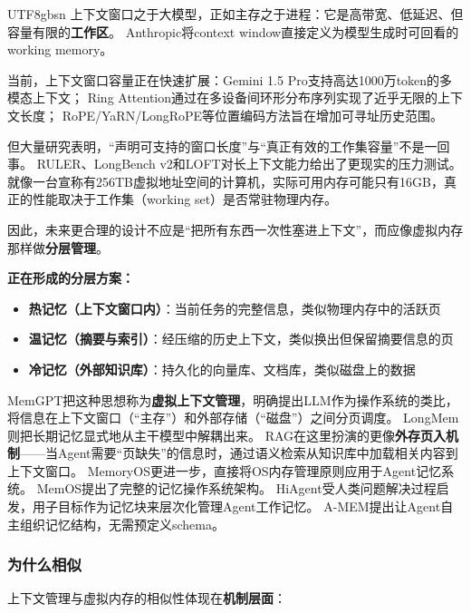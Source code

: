 \documentclass[11pt,a4paper]{article}
\begin{document}
\begin{CJK*}{UTF8}{gbsn}
上下文窗口之于大模型，正如主存之于进程：它是高带宽、低延迟、但容量有限的\textbf{工作区}。
Anthropic将context window直接定义为模型生成时可回看的working memory。

当前，上下文窗口容量正在快速扩展：Gemini 1.5 Pro支持高达1000万token的多模态上下文\cite{gemini2024}；
Ring Attention通过在多设备间环形分布序列实现了近乎无限的上下文长度\cite{liu2024ringattention}；
RoPE/YaRN/LongRoPE等位置编码方法旨在增加可寻址历史范围\cite{su2021roformer,yarn2024,longrope2024}。

但大量研究表明，``声明可支持的窗口长度''与``真正有效的工作集容量''不是一回事。
RULER、LongBench v2和LOFT对长上下文能力给出了更现实的压力测试\cite{ruler2024,longbenchv2_2024,loft2024}。
就像一台宣称有256TB虚拟地址空间的计算机，实际可用内存可能只有16GB，真正的性能取决于工作集（working set）是否常驻物理内存。

因此，未来更合理的设计不应是``把所有东西一次性塞进上下文''，而应像虚拟内存那样做\textbf{分层管理}。

\textbf{正在形成的分层方案：}
\begin{itemize}[nosep]
\item \textbf{热记忆（上下文窗口内）}：当前任务的完整信息，类似物理内存中的活跃页
\item \textbf{温记忆（摘要与索引）}：经压缩的历史上下文，类似换出但保留摘要信息的页
\item \textbf{冷记忆（外部知识库）}：持久化的向量库、文档库，类似磁盘上的数据
\end{itemize}

MemGPT把这种思想称为\textbf{虚拟上下文管理}，明确提出LLM作为操作系统的类比，将信息在上下文窗口（``主存''）和外部存储（``磁盘''）之间分页调度\cite{memgpt2023}。
LongMem则把长期记忆显式地从主干模型中解耦出来\cite{longmem2023}。
RAG在这里扮演的更像\textbf{外存页入机制}——当Agent需要``页缺失''的信息时，通过语义检索从知识库中加载相关内容到上下文窗口\cite{lewis2020rag}。
MemoryOS更进一步，直接将OS内存管理原则应用于Agent记忆系统\cite{memoryos2025}。
MemOS提出了完整的记忆操作系统架构\cite{memos2025}。
HiAgent受人类问题解决过程启发，用子目标作为记忆块来层次化管理Agent工作记忆\cite{hiagent2024}。
A-MEM提出让Agent自主组织记忆结构，无需预定义schema\cite{amem2025}。

\subsubsection{为什么相似}

上下文管理与虚拟内存的相似性体现在\textbf{机制层面}：


\end{CJK*}
\end{document}

